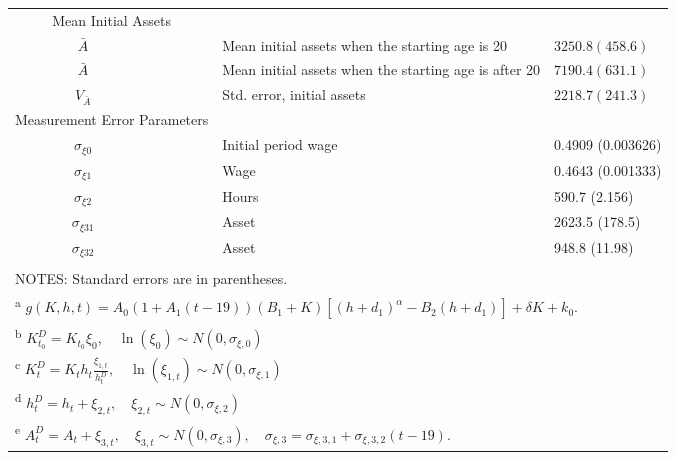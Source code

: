 \documentclass[10pt, letterpaper]{article}
\begin{document}
\begin{center}
\begin{table}
{\begin{tabularx}{1.5\textwidth}{c l l l}
    \multicolumn{2}{c}{Mean Initial Assets} & {} & {} \\
    $\bar{A}$ & {} &  Mean initial assets when the starting age is 20  & $3250.8 (458.6)$  \\
    $\bar{A}$ & {} &  Mean initial assets when the starting age is after 20  &  $7190.4 (631.1)$   \\
    $V_{\bar{A}}$ & {} & Std. error, initial assets  &  $2218.7 (241.3)$   \\
\multicolumn{2}{c}{Measurement Error Parameters} & {} & {} \\
    $\sigma_{\xi 0}$&  {} & Initial period wage \footnotemark    &   0.4909 (0.003626)  \\
    $\sigma_{\xi 1}$&  {} & Wage \footnotemark   &  0.4643 (0.001333)   \\
$\sigma_{\xi 2}$    &  {} & Hours \footnotemark  &  590.7 (2.156)   \\
$\sigma_{\xi 31}$    &  {} & Asset \footnotemark   &   2623.5 (178.5)  \\
    $\sigma_{\xi 32}$    &  {} & Asset   &  948.8 (11.98)   \\
   \\\hline
   \multicolumn{4}{l}{NOTES: Standard errors are in parentheses.}  \\
   \multicolumn{4}{l}{\textsuperscript{a} \footnotesize{ $g(K,h,t) = A_0 (1 + A_1(t-19))(B_1 + K)[(h + d_1)^{\alpha} - B_2 (h + d_1)] + \delta K + k_0.$}}  \\
   \multicolumn{4}{l}{\textsuperscript{b} \footnotesize{$K_{t_0}^D=K_{t_0} \xi_0, \quad \ln \left(\xi_0\right) \sim N\left(0, \sigma_{\xi, 0}\right)$}}  \\
   \multicolumn{4}{l}{\textsuperscript{c} \footnotesize{$K_t^D=K_t h_t \frac{\xi_{1, t}}{h_t^D}, \quad \ln \left(\xi_{1, t}\right) \sim N\left(0, \sigma_{\xi, 1}\right)$}}  \\
   \multicolumn{4}{l}{\textsuperscript{d} \footnotesize{$h_t^D=h_t+\xi_{2, t}, \quad \xi_{2, t} \sim N\left(0, \sigma_{\xi, 2}\right)$}}  \\
   \multicolumn{4}{l}{\textsuperscript{e} \footnotesize{$A_t^D=A_t+\xi_{3, t}, \quad \xi_{3, t} \sim N\left(0, \sigma_{\xi, 3}\right), \quad \sigma_{\xi, 3}=\sigma_{\xi, 3,1}+\sigma_{\xi, 3,2}(t-19) .$}}  \\
 \end{tabularx}
 }
  \label{fig:EstimationResults}
 \end{table}
\end{center}
\end{document}
